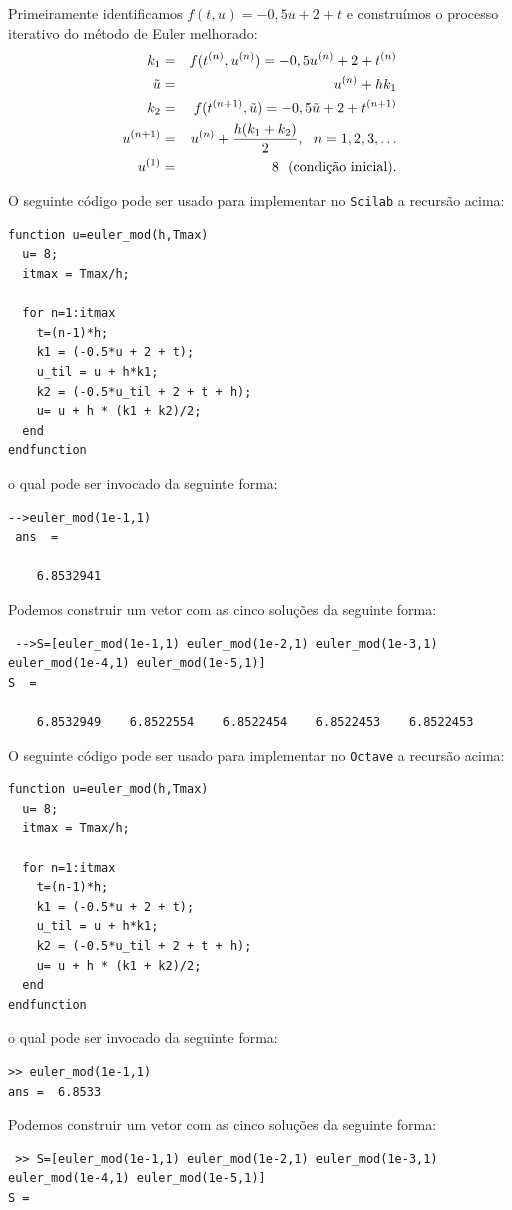 \begin{resol} Primeiramente identificamos $f(t,u)=-0,5u+2+t$ e construímos o processo iterativo do método de Euler melhorado:
\begin{eqnarray}
  k_1&=&  f(t^{(n)},u^{(n)})=-0,5u^{(n)}+2+t^{(n)}\\
  \tilde{u}&=& u^{(n)} + hk_1\\
  k_2&=&  f(t^{(n+1)},\tilde{u})=-0,5\tilde{u}+2+t^{(n+1)}\\
  u^{(n+1)}&=&u^{(n)} + \dfrac{h( k_1+k_2)}{2},~~n=1,2,3,\ldots\\
  u^{(1)}&=&8 ~~ \hbox{\text{(condição inicial)}}.
\end{eqnarray}

\ifisscilab
O seguinte código pode ser usado para implementar no \verb+Scilab+ a recursão acima:
\begin{verbatim}
function u=euler_mod(h,Tmax)
  u= 8;
  itmax = Tmax/h;

  for n=1:itmax
    t=(n-1)*h;
    k1 = (-0.5*u + 2 + t);
    u_til = u + h*k1;
    k2 = (-0.5*u_til + 2 + t + h);
    u= u + h * (k1 + k2)/2;
  end
endfunction
\end{verbatim}
o qual pode ser invocado da seguinte forma:
\begin{verbatim}
-->euler_mod(1e-1,1)
 ans  =

    6.8532941
\end{verbatim}
Podemos construir um vetor com as cinco soluções da seguinte forma:
\begin{verbatim}
 -->S=[euler_mod(1e-1,1) euler_mod(1e-2,1) euler_mod(1e-3,1) euler_mod(1e-4,1) euler_mod(1e-5,1)]
S  =

    6.8532949    6.8522554    6.8522454    6.8522453    6.8522453
 \end{verbatim}
\fi
\ifisoctave
O seguinte código pode ser usado para implementar no \verb+Octave+ a recursão acima:
\begin{verbatim}
function u=euler_mod(h,Tmax)
  u= 8;
  itmax = Tmax/h;

  for n=1:itmax
    t=(n-1)*h;
    k1 = (-0.5*u + 2 + t);
    u_til = u + h*k1;
    k2 = (-0.5*u_til + 2 + t + h);
    u= u + h * (k1 + k2)/2;
  end
endfunction
\end{verbatim}
o qual pode ser invocado da seguinte forma:
\begin{verbatim}
>> euler_mod(1e-1,1)
ans =  6.8533
\end{verbatim}
Podemos construir um vetor com as cinco soluções da seguinte forma:
\begin{verbatim}
 >> S=[euler_mod(1e-1,1) euler_mod(1e-2,1) euler_mod(1e-3,1) euler_mod(1e-4,1) euler_mod(1e-5,1)]
S =


\end{verbatim}
\end{resol}
